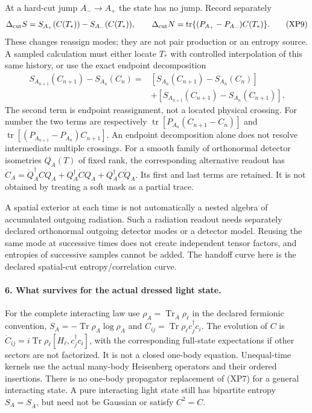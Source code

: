 \documentclass[11pt]{article}
\DeclareMathOperator{\Tr}{Tr}
\DeclareMathOperator{\tr}{tr}
\begin{document}
At a hard-cut jump $A_-\to A_+$ the state has no jump.
Record separately
\begin{equation}
 \Delta_{\rm cut}S=S_{A_+}(C(T_*))-S_{A_-}(C(T_*)),\qquad
 \Delta_{\rm cut}N=\tr\{(P_{A_+}-P_{A_-})C(T_*)\}.
 \tag{XP9}
\end{equation}
These changes reassign modes; they are not pair production or
an entropy source.  A sampled calculation must either locate $T_*$
with controlled interpolation of this same history, or use the
exact endpoint decomposition
\[
 \begin{split}
 S_{A_{n+1}}(C_{n+1})-S_{A_n}(C_n)
 ={}&[S_{A_n}(C_{n+1})-S_{A_n}(C_n)]\\
   &+[S_{A_{n+1}}(C_{n+1})-S_{A_n}(C_{n+1})].
 \end{split}
\]
The second term is endpoint reassignment, not a located physical
crossing.  For number the two terms are respectively
$\tr[P_{A_n}(C_{n+1}-C_n)]$ and
$\tr[(P_{A_{n+1}}-P_{A_n})C_{n+1}]$.
An endpoint decomposition alone does not resolve intermediate
multiple crossings.  For a smooth family of orthonormal detector
isometries $Q_A(T)$ of fixed rank, the corresponding alternative
readout has
$\dot C_A=\dot Q_A^\dagger C Q_A+Q_A^\dagger\dot C Q_A+
Q_A^\dagger C\dot Q_A$.  Its first and last terms are retained.
It is not obtained by treating a soft mask as a partial trace.

A spatial exterior at each time is not automatically a nested
algebra of accumulated outgoing radiation.  Such a radiation
readout needs separately declared orthonormal outgoing detector
modes or a detector model.  Reusing the same mode at successive
times does not create independent tensor factors, and entropies
of successive samples cannot be added.  The handoff curve here
is the declared spatial-cut entropy/correlation curve.

\paragraph{6. What survives for the actual dressed light state.}
For the complete interacting law use
$\rho_A=\Tr_{\bar A}\rho_\ell$ in the declared fermionic convention,
$S_A=-\Tr\rho_A\log\rho_A$ and
$C_{ij}=\Tr\rho_\ell c_j^\dagger c_i$.
The evolution of $C$ is
$\dot C_{ij}=i\Tr\rho_\ell[H_\ell,c_j^\dagger c_i]$,
with the corresponding full-state expectations if other sectors
are not factorized.  It is not a closed one-body equation.
Unequal-time kernels use the actual many-body Heisenberg
operators and their ordered insertions.  There is no one-body
propagator replacement of (XP7) for a general interacting state.
A pure interacting light state still has bipartite entropy
$S_A=S_{\bar A}$, but need not be Gaussian or satisfy $C^2=C$.
\end{document}
